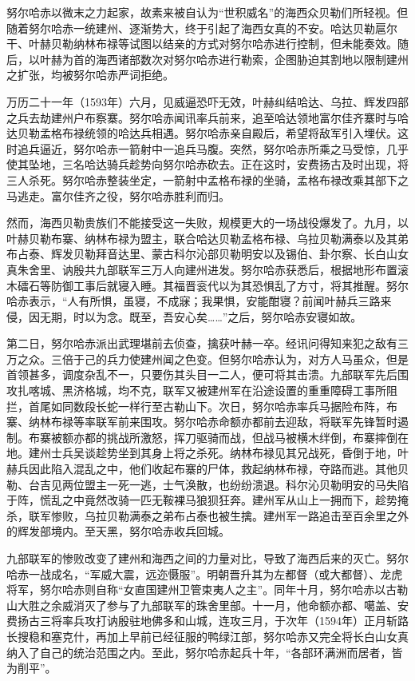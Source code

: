 努尔哈赤以微末之力起家，故素来被自认为“世积威名”的海西众贝勒们所轻视。但随着努尔哈赤一统建州、逐渐势大，终于引起了海西女真的不安。哈达贝勒扈尔干、叶赫贝勒纳林布禄等试图以结亲的方式对努尔哈赤进行控制，但未能奏效。随后，以叶赫为首的海西诸部数次对努尔哈赤进行勒索，企图胁迫其割地以限制建州之扩张，均被努尔哈赤严词拒绝。

万历二十一年（1593年）六月，见威逼恐吓无效，叶赫纠结哈达、乌拉、辉发四部之兵去劫建州户布察寨。努尔哈赤闻讯率兵前来，追至哈达领地富尔佳齐寨时与哈达贝勒孟格布禄统领的哈达兵相遇。努尔哈赤亲自殿后，希望将敌军引入埋伏。这时追兵逼近，努尔哈赤一箭射中一追兵马腹。突然，努尔哈赤所乘之马受惊，几乎使其坠地，三名哈达骑兵趁势向努尔哈赤砍去。正在这时，安费扬古及时出现，将三人杀死。努尔哈赤整装坐定，一箭射中孟格布禄的坐骑，孟格布禄改乘其部下之马逃走。富尔佳齐之役，努尔哈赤胜利而归。

然而，海西贝勒贵族们不能接受这一失败，规模更大的一场战役爆发了。九月，以叶赫贝勒布寨、纳林布禄为盟主，联合哈达贝勒孟格布禄、乌拉贝勒满泰以及其弟布占泰、辉发贝勒拜音达里、蒙古科尔沁部贝勒明安以及锡伯、卦尔察、长白山女真朱舍里、讷殷共九部联军三万人向建州进发。努尔哈赤获悉后，根据地形布置滚木礌石等防御工事后就寝入睡。其福晋衮代以为其恐惧乱了方寸，将其推醒。努尔哈赤表示，“人有所惧，虽寝，不成寐；我果惧，安能酣寝？前闻叶赫兵三路来侵，因无期，时以为念。既至，吾安心矣……”之后，努尔哈赤安寝如故。

第二日，努尔哈赤派出武理堪前去侦查，擒获叶赫一卒。经讯问得知来犯之敌有三万之众。三倍于己的兵力使建州闻之色变。但努尔哈赤认为，对方人马虽众，但是首领甚多，调度杂乱不一，只要伤其头目一二人，便可将其击溃。九部联军先后围攻扎喀城、黑济格城，均不克，联军又被建州军在沿途设置的重重障碍工事所阻拦，首尾如同数段长蛇一样行至古勒山下。次日，努尔哈赤率兵马据险布阵，布寨、纳林布禄等率联军前来围攻。努尔哈赤命额亦都前去迎敌，将联军先锋暂时遏制。布寨被额亦都的挑战所激怒，挥刀驱骑而战，但战马被横木绊倒，布寨摔倒在地。建州士兵吴谈趁势坐到其身上将之杀死。纳林布禄见其兄战死，昏倒于地，叶赫兵因此陷入混乱之中，他们收起布寨的尸体，救起纳林布禄，夺路而逃。其他贝勒、台吉见两位盟主一死一逃，士气涣散，也纷纷溃退。科尔沁贝勒明安的马失陷于阵，慌乱之中竟然改骑一匹无鞍裸马狼狈狂奔。建州军从山上一拥而下，趁势掩杀，联军惨败，乌拉贝勒满泰之弟布占泰也被生擒。建州军一路追击至百余里之外的辉发部境内。至天黑，努尔哈赤收兵回城。

九部联军的惨败改变了建州和海西之间的力量对比，导致了海西后来的灭亡。努尔哈赤一战成名，“军威大震，远迩慑服”。明朝晋升其为左都督（或大都督）、龙虎将军，努尔哈赤则自称“女直国建州卫管束夷人之主”。同年十月，努尔哈赤以古勒山大胜之余威消灭了参与了九部联军的珠舍里部。十一月，他命额亦都、噶盖、安费扬古三将率兵攻打讷殷驻地佛多和山城，连攻三月，于次年（1594年）正月斩路长搜稳和塞克什，再加上早前已经征服的鸭绿江部，努尔哈赤又完全将长白山女真纳入了自己的统治范围之内。至此，努尔哈赤起兵十年，“各部环满洲而居者，皆为削平”。

